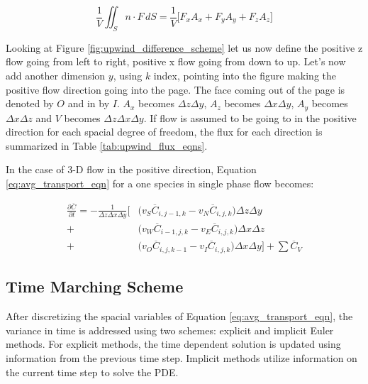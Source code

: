 \newpage
\FloatBarrier

\begin{equation}
    \frac{1}{V}\iint_S n \cdot F \,dS = \frac{1}{V}\bigg[ F_{x}A_{x} + F_{y}A_{y} + F_{z}A_{z}\bigg]
    \label{eq:integral_to_flux}
\end{equation}

Looking at Figure \ref{fig:upwind_difference_scheme} let us now define the positive z flow going from left to right, positive x flow going from down to up. Let's now add another dimension $y$, using $k$ index, pointing into the figure making the positive flow direction going into the page. The face coming out of the page is denoted by $O$ and in by $I$. $A_{x}$ becomes $\Delta z \Delta y$, $A_{z}$ becomes $\Delta x \Delta y$, $A_{y}$ becomes $\Delta x \Delta z$ and $V$ becomes $\Delta z \Delta x \Delta y$. If flow is assumed to be going to in the positive direction for each spacial degree of freedom, the flux for each direction is summarized in Table \ref{tab:upwind_flux_eqns}. 

In the case of 3-D flow in the positive direction, Equation \ref{eq:avg_transport_eqn} for a one species in single phase flow becomes:

\begin{equation}
\begin{aligned}
    \frac{\partial \overline{C}}{\partial t} = - \frac{1}{\Delta z \Delta x \Delta y}
     \bigg[ & \big(v_{S} \overline{C}_{i,j-1,k} - v_{N}\overline{C}_{i,j,k}\big)\Delta z \Delta y \\ + 
    & \big(v_{W} \overline{C}_{i-1,j,k} - v_{E}\overline{C}_{i,j,k}\big)\Delta x \Delta z \\ + 
    & \big(v_{O} \overline{C}_{i,j,k-1} - v_{I}\overline{C}_{i,j,k}\big)\Delta x \Delta y \bigg] + \sum \overline{C}_{V}
    \label{eq:avg_transport_eqn_with_flux}
\end{aligned}
\end{equation}

\subsection{Time Marching Scheme}
After discretizing the spacial variables of Equation \ref{eq:avg_transport_eqn}, the variance in time is addressed using two schemes: explicit and implicit Euler methods. For explicit methods, the time dependent solution is updated using information from the previous time step. Implicit methods utilize information on the current time step to solve the PDE. 

